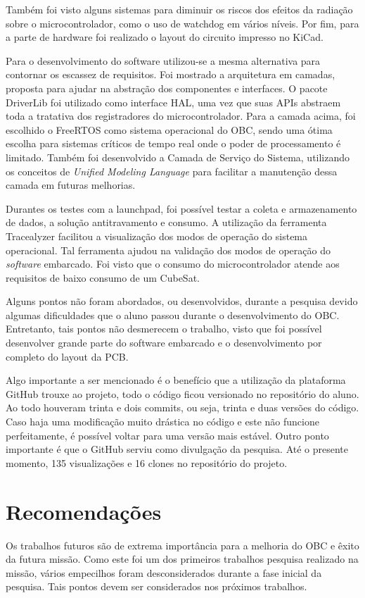 Também foi visto alguns sistemas para diminuir os riscos dos efeitos da radiação sobre o microcontrolador, como o uso de watchdog em vários níveis. Por fim, para a parte de hardware foi realizado o layout do circuito impresso no KiCad.

Para o desenvolvimento do software utilizou-se a mesma alternativa para contornar os escassez de requisitos. Foi mostrado a arquitetura em camadas, proposta para ajudar na abstração dos componentes e interfaces. O pacote DriverLib foi utilizado como interface HAL, uma vez que suas APIs abstraem toda a tratativa dos registradores do microcontrolador. Para a camada acima, foi escolhido o FreeRTOS como sistema operacional do OBC, sendo uma ótima escolha para sistemas críticos de tempo real onde o poder de processamento é limitado. Também foi desenvolvido a Camada de Serviço do Sistema, utilizando os conceitos de \textit{Unified Modeling Language} para facilitar a manutenção dessa camada em futuras melhorias. 

Durantes os testes com a launchpad, foi possível testar a coleta e armazenamento de dados, a solução antitravamento e consumo. A utilização da ferramenta Tracealyzer facilitou a visualização dos modos de operação do sistema operacional. Tal ferramenta ajudou na validação dos modos de operação do \textit{software} embarcado. Foi visto que o consumo do microcontrolador atende aos requisitos de baixo consumo de um CubeSat.    

Alguns pontos não foram abordados, ou desenvolvidos, durante a pesquisa devido algumas dificuldades que o aluno passou durante o desenvolvimento do OBC. Entretanto, tais pontos não desmerecem o trabalho, visto que foi possível desenvolver grande parte do software embarcado e o desenvolvimento por completo do layout da PCB. %

Algo importante a ser mencionado é o benefício que a utilização da plataforma GitHub trouxe ao projeto, todo o código ficou versionado no repositório do aluno. Ao todo houveram trinta e dois commits, ou seja, trinta e duas versões do código. Caso haja uma modificação muito drástica no código e este não funcione perfeitamente, é possível voltar para uma versão mais estável. Outro ponto importante é que o GitHub serviu como divulgação da pesquisa. Até o presente momento, 135 visualizações e 16 clones no repositório do projeto.  


\section{Recomendações}
\label{Recomendações}
Os trabalhos futuros são de extrema importância para a melhoria do OBC e êxito da futura missão. Como este foi um dos primeiros trabalhos pesquisa realizado na missão, vários empecilhos foram desconsiderados durante a fase inicial da pesquisa. Tais pontos devem ser considerados nos próximos trabalhos.

